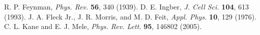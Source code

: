 \documentclass[a4paper,11pt,ja=standard,lualatex]{bxjsarticle}
\begin{document}
\FloatBarrier
\begin{thebibliography}{9}
 R. P. Feynman, \textit{Phys. Rev.} \textbf{56}, 340 (1939).
 D. E. Ingber, \textit{J. Cell Sci.} \textbf{104}, 613 (1993).
 J. A. Fleck Jr., J. R. Morris, and M. D. Feit, \textit{Appl. Phys.} \textbf{10}, 129 (1976).
 C. L. Kane and E. J. Mele, \textit{Phys. Rev. Lett.} \textbf{95}, 146802 (2005).
\end{thebibliography}
\end{document}
